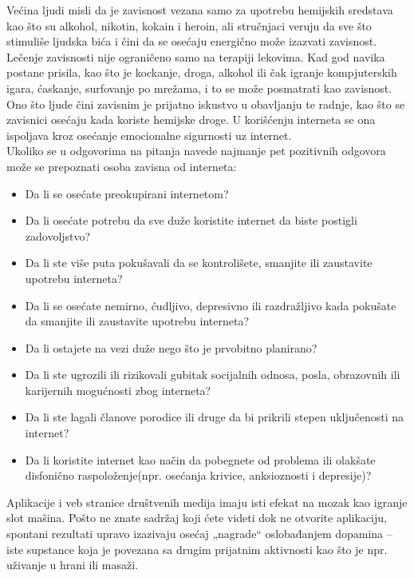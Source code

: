 \documentclass[a4paper]{article}
\begin{document}
{		Većina ljudi misli da je zavisnost vezana samo za upotrebu hemijskih sredstava kao što su alkohol, nikotin, kokain i heroin, ali stručnjaci veruju da sve što stimuliše ljudska bića i čini da se osećaju energično može izazvati zavisnost. Lečenje zavisnosti nije ograničeno samo na terapiji lekovima. Kad god navika postane prisila, kao što je kockanje, droga, alkohol ili čak igranje kompjuterskih igara, ćaskanje, surfovanje po mrežama, i to se može posmatrati kao zavisnost. Ono što ljude čini zavisnim je prijatno iskustvo u obavljanju te radnje, kao što se zavisnici osećaju kada koriste hemijske droge. U korišćenju interneta se ona ispoljava kroz osećanje emocionalne sigurnosti uz internet.\\
		Ukoliko se u odgovorima na pitanja navede najmanje pet pozitivnih odgovora može se prepoznati osoba zavisna od interneta:
		\begin{itemize}
			\item
			Da li se osećate preokupirani internetom?
			\item
			Da li osećate potrebu da sve duže koristite internet da biste postigli zadovoljstvo?
			\item
			Da li ste više puta pokušavali da se kontrolišete, smanjite ili zaustavite upotrebu interneta?
			\item
			Da li se osećate nemirno, ćudljivo, depresivno ili razdražljivo kada pokušate da smanjite ili zaustavite upotrebu interneta?
			\item
			Da li ostajete na vezi duže nego što je prvobitno planirano?
			\item
			Da li ste ugrozili ili rizikovali gubitak socijalnih odnosa, posla, obrazovnih ili karijernih mogućnosti zbog interneta?
			\item
			Da li ste lagali članove porodice ili druge da bi prikrili stepen uključenosti na internet?
			\item Da li koristite internet kao način da pobegnete od problema ili olakšate disfonično raspoloženje(npr. osećanja krivice, anksioznosti i depresije)?
		\end{itemize}
		Aplikacije i veb stranice društvenih medija imaju isti efekat na mozak kao igranje slot mašina. Pošto ne znate sadržaj koji ćete videti dok ne otvorite aplikaciju, spontani rezultati upravo izazivaju osećaj „nagrade“ oslobađanjem dopamina – iste supstance koja je povezana sa drugim prijatnim aktivnosti kao što je npr. uživanje u hrani ili masaži.\\\\
}
\end{document}
